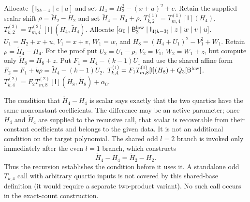 \begin{algorithm}[H]
    \caption{Shared-product bases for $T_{k,D}$ ($D=2$ with $k$ even,
    and $D=4$ with $k$ odd).}
    \label{alg:constr-Tk2l-base}
      \begin{algorithmic}
              \State Allocate $[\mathsf I_{2k-4}\mid e\mid a]$ and set
              $H_4=H_2^2-(x+a)^2+e$.
              \State Retain the supplied scalar shift
              $\rho=\widetilde H_2-H_2$ and set
              $\widetilde H_4=H_4+\rho$.
              \State $T^{(1)}_{k,2}=T^{(1)}_{m,4}[\mathsf I](H_4)$,
              \qquad
              $T^{(2)}_{k,2}=T^{(2)}_{m,4}[\mathsf I]
                 (H_4,\widetilde H_4)$.
          \Else {}
              \State Allocate
              $[\alpha_0\mid\mathsf B^{\rm low}_3
                \mid\mathsf I_{4(k-3)}\mid z\mid w\mid v\mid u]$.
              \State $U_1=H_2+x+u$, $V_1=x+v$, $W_1=w$, and
              $H_8=(H_4+U_1)^2-V_1^2+W_1$.
              \State Retain $\rho=\widetilde H_4-H_4$.  For the proof put
              $U_2=U_1-\rho$, $V_2=V_1$, $W_2=W_1+z$, but compute only
              $\widetilde H_8=H_8+z$.
              \State Put $F_1=H_4-(k-1)U_1$ and use the shared affine form
              $F_2=F_1+k\rho
                    =\widetilde H_4-(k-1)U_2$.
              \State $T^{(1)}_{k,4}=F_1
                T^{(1)}_{m,8}[\mathsf I](H_8)
                +Q_3[\mathsf B^{\rm low}]$.
              \State $T^{(2)}_{k,4}=F_2
                T^{(2)}_{m,8}[\mathsf I](H_8,\widetilde H_8)
                +\alpha_0$.
          \EndIf
      \end{algorithmic}
  \end{algorithm}
\begin{remark}
    The condition that $\tilde H_4-H_4$ is scalar says exactly that the two
    quartics have the same nonconstant coefficients.  The difference may be
    an active parameter; once $H_4$ and $\tilde H_4$ are supplied to the
    recursive call, that scalar is recoverable from their constant
    coefficients and belongs to the given data.  It is not an additional
    condition on the target polynomial.  The shared odd $l=2$ branch is invoked
    only immediately after the even $l=1$ branch, which constructs
    \[
       \tilde H_4-H_4=\tilde H_2-H_2.
    \]
    Thus the recursion establishes the condition before it uses it.  A
    standalone odd $T_{k,4}$ call with arbitrary quartic inputs is not covered
    by this shared-base definition (it would require a separate two-product
    variant).  No such call occurs in the exact-count construction.
\end{remark}

